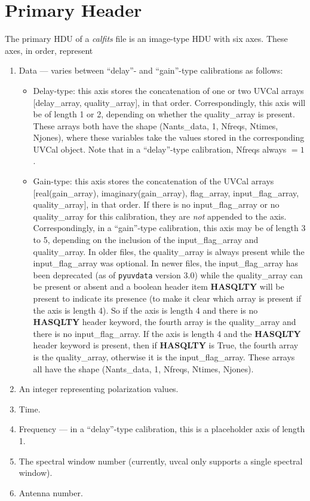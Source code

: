 \documentclass[11pt, oneside, english]{article}   	%
\begin{document}
\section{Primary Header}\label{primary}
The primary HDU of a \emph{calfits} file is an image-type HDU with six axes.
These axes, in order, represent 
\begin{enumerate}
	\item{Data --- varies between ``delay''- and ``gain''-type calibrations as follows:}
	\begin{itemize}
	\item Delay-type: this axis stores the concatenation of one or two UVCal arrays [delay\_array, quality\_array], in that order.
	Correspondingly, this axis will be of length 1 or 2, depending on whether the quality\_array is present.
	These arrays both have the shape (Nants\_data, 1, Nfreqs, Ntimes, Njones), where these variables take the values stored in the corresponding UVCal object. 
	Note that in a ``delay''-type calibration, Nfreqs always $=1$.
	\item Gain-type: this axis stores the concatenation of the UVCal arrays [real(gain\_array), imaginary(gain\_array), flag\_array, input\_flag\_array, quality\_array], in that order.
	If there is no input\_flag\_array or no quality\_array for this calibration, they are \emph{not} appended to the axis.
	Correspondingly, in a ``gain''-type calibration, this axis may be of length 3 to 5, depending on the inclusion of the input\_flag\_array and quality\_array.
	In older files, the quality\_array is always present while the input\_flag\_array was optional. In newer files, the input\_flag\_array has been deprecated (as of \texttt{pyuvdata} version 3.0)
    while the quality\_array can be present or absent and a boolean header item \textbf{HASQLTY} will be present to indicate its presence
	(to make it clear which array is present if the axis is length 4). So if the axis is length 4 and there is no \textbf{HASQLTY} header keyword,
	the fourth array is the quality\_array and there is no input\_flag\_array. If the axis is length 4 and the \textbf{HASQLTY} header keyword is present, then
	if \textbf{HASQLTY} is True, the fourth array is the quality\_array, otherwise it is the input\_flag\_array.
	These arrays all have the shape (Nants\_data, 1, Nfreqs, Ntimes, Njones).
	\end{itemize}
	\item{An integer representing polarization values.}
	\item{Time.}
	\item{Frequency --- in a ``delay''-type calibration, this is a placeholder axis of length 1.}
	\item{The spectral window number (currently, uvcal only supports a single spectral window).}
	\item{Antenna number.}
\end{enumerate}
\end{document}
